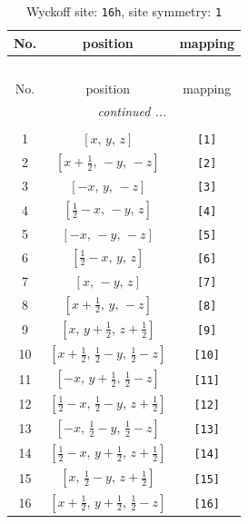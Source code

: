 \documentclass[fleqn,8pt]{jsarticle}
\begin{document}
\begin{longtable}{ccc}
\caption{Wyckoff site: {\tt 16h}, site symmetry: {\tt 1}}
 \\
 \hline \hline
No. & position & mapping \\ \hline \endfirsthead

\multicolumn{2}{l}{\tablename\ \thetable{}} \\
 \hline \hline
No. & position & mapping \\ \hline \endhead

 \hline \hline
\multicolumn{2}{r}{\footnotesize\it continued ...} \\ \endfoot

 \hline \hline
\multicolumn{2}{r}{} \\ \endlastfoot

1 & $\left[ x,\, y,\, z \right]$ & {\tt [1]} \\ \hline
2 & $\left[ x + \frac{1}{2},\, - y,\, - z \right]$ & {\tt [2]} \\ \hline
3 & $\left[ - x,\, y,\, - z \right]$ & {\tt [3]} \\ \hline
4 & $\left[ \frac{1}{2} - x,\, - y,\, z \right]$ & {\tt [4]} \\ \hline
5 & $\left[ - x,\, - y,\, - z \right]$ & {\tt [5]} \\ \hline
6 & $\left[ \frac{1}{2} - x,\, y,\, z \right]$ & {\tt [6]} \\ \hline
7 & $\left[ x,\, - y,\, z \right]$ & {\tt [7]} \\ \hline
8 & $\left[ x + \frac{1}{2},\, y,\, - z \right]$ & {\tt [8]} \\ \hline
9 & $\left[ x,\, y + \frac{1}{2},\, z + \frac{1}{2} \right]$ & {\tt [9]} \\ \hline
10 & $\left[ x + \frac{1}{2},\, \frac{1}{2} - y,\, \frac{1}{2} - z \right]$ & {\tt [10]} \\ \hline
11 & $\left[ - x,\, y + \frac{1}{2},\, \frac{1}{2} - z \right]$ & {\tt [11]} \\ \hline
12 & $\left[ \frac{1}{2} - x,\, \frac{1}{2} - y,\, z + \frac{1}{2} \right]$ & {\tt [12]} \\ \hline
13 & $\left[ - x,\, \frac{1}{2} - y,\, \frac{1}{2} - z \right]$ & {\tt [13]} \\ \hline
14 & $\left[ \frac{1}{2} - x,\, y + \frac{1}{2},\, z + \frac{1}{2} \right]$ & {\tt [14]} \\ \hline
15 & $\left[ x,\, \frac{1}{2} - y,\, z + \frac{1}{2} \right]$ & {\tt [15]} \\ \hline
16 & $\left[ x + \frac{1}{2},\, y + \frac{1}{2},\, \frac{1}{2} - z \right]$ & {\tt [16]} \\
\end{longtable}
\end{document}
